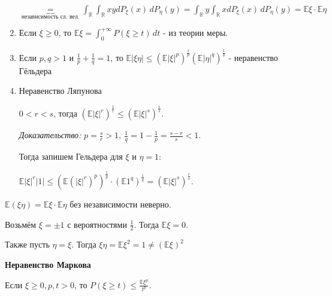 \begin{properties}
\begin{enumerate}
{            $\underbrace{=}_{\text{независимость сл. вел.}} \int_{\mathbb{R}} \int_{\mathbb{R}} xy dP_{\xi} (x) \, dP_{\eta} (y) =
            \int_{\mathbb{R}} y \int_{\mathbb{R}} x dP_{\xi} (x) \, dP_{\eta} (y) = \mathbb{E} \xi \cdot \mathbb{E} \eta$
        }
        \item {
            Если $\xi \geqslant 0$, то $\mathbb{E} \xi = \int_{0}^{+\infty} P(\xi \geqslant t) \, dt$ - из теории меры.
        }
        \item {
            Если $p, q > 1$ и $\frac{1}{p} + \frac{1}{q} = 1$, то $\mathbb{E}|\xi \eta| \leqslant (\mathbb{E}|\xi|^p)^{\frac{1}{p}} (\mathbb{E} |\eta|^q)^{\frac{1}{q}}$ - 
            неравенство Гёльдера
        }
        \item {
            Неравенство Ляпунова

            $0 < r < s$, тогда $(\mathbb{E} |\xi| ^ r)^{\frac{1}{r}} \leqslant (\mathbb{E}|\xi|^s)^{\frac{1}{s}}$.

            \textit{Доказательство:} $p = \frac{s}{r} > 1, \ \frac{1}{q} = 1 - \frac{1}{p} = \frac{s - r}{s} < 1$.

            Тогда запишем Гельдера для $\xi$ и $\eta = 1$:
            
            $\mathbb{E} |\xi|^r |1| \leq \left(\mathbb{E} (|\xi|^r)^p \right)^{\frac{1}{p}} \cdot \left( \mathbb{E} 1^q \right)^{\frac{1}{q}} = \left( \mathbb{E} |\xi|^s \right)^{\frac{r}{s}}$.
            

        }
    \end{enumerate}
\end{properties}

\begin{remark}
    $\mathbb{E}(\xi \eta) = \mathbb{E}\xi \cdot \mathbb{E} \eta$ без независимости неверно. 
    
    Возьмём $\xi = \pm 1$ с вероятностями $\frac{1}{2}$. Тогда $\mathbb{E} \xi = 0$.

    Также пусть $\eta = \xi$. Тогда $\mathbb{\xi \eta} = \mathbb{E} \xi^2 = 1 \neq (\mathbb{E} \xi)^2$
\end{remark}

\begin{theorem}
    \textbf{Неравенство Маркова}

    Если $\xi \geqslant 0, p, t > 0$, то $P(\xi \geqslant t) \leqslant \frac{\mathbb{E}\xi^p}{t^p}$.
\end{theorem}

